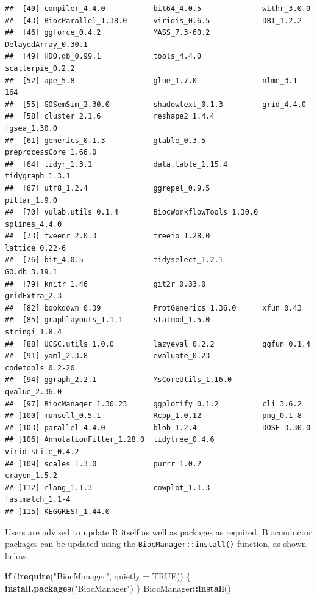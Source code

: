 \documentclass[9pt,a4paper,]{extarticle}
\newenvironment{Shaded}{\begin{snugshade}}{\end{snugshade}}
\newcommand{\AttributeTok}[1]{\textcolor[rgb]{0.13,0.29,0.53}{#1}}
\newcommand{\ConstantTok}[1]{\textcolor[rgb]{0.56,0.35,0.01}{#1}}
\newcommand{\ControlFlowTok}[1]{\textcolor[rgb]{0.13,0.29,0.53}{\textbf{#1}}}
\newcommand{\FunctionTok}[1]{\textcolor[rgb]{0.13,0.29,0.53}{\textbf{#1}}}
\newcommand{\NormalTok}[1]{#1}
\newcommand{\SpecialCharTok}[1]{\textcolor[rgb]{0.81,0.36,0.00}{\textbf{#1}}}
\newcommand{\StringTok}[1]{\textcolor[rgb]{0.31,0.60,0.02}{#1}}
\begin{document}
\begin{verbatim}
##  [40] compiler_4.4.0           bit64_4.0.5              withr_3.0.0             
##  [43] BiocParallel_1.38.0      viridis_0.6.5            DBI_1.2.2               
##  [46] ggforce_0.4.2            MASS_7.3-60.2            DelayedArray_0.30.1     
##  [49] HDO.db_0.99.1            tools_4.4.0              scatterpie_0.2.2        
##  [52] ape_5.8                  glue_1.7.0               nlme_3.1-164            
##  [55] GOSemSim_2.30.0          shadowtext_0.1.3         grid_4.4.0              
##  [58] cluster_2.1.6            reshape2_1.4.4           fgsea_1.30.0            
##  [61] generics_0.1.3           gtable_0.3.5             preprocessCore_1.66.0   
##  [64] tidyr_1.3.1              data.table_1.15.4        tidygraph_1.3.1         
##  [67] utf8_1.2.4               ggrepel_0.9.5            pillar_1.9.0            
##  [70] yulab.utils_0.1.4        BiocWorkflowTools_1.30.0 splines_4.4.0           
##  [73] tweenr_2.0.3             treeio_1.28.0            lattice_0.22-6          
##  [76] bit_4.0.5                tidyselect_1.2.1         GO.db_3.19.1            
##  [79] knitr_1.46               git2r_0.33.0             gridExtra_2.3           
##  [82] bookdown_0.39            ProtGenerics_1.36.0      xfun_0.43               
##  [85] graphlayouts_1.1.1       statmod_1.5.0            stringi_1.8.4           
##  [88] UCSC.utils_1.0.0         lazyeval_0.2.2           ggfun_0.1.4             
##  [91] yaml_2.3.8               evaluate_0.23            codetools_0.2-20        
##  [94] ggraph_2.2.1             MsCoreUtils_1.16.0       qvalue_2.36.0           
##  [97] BiocManager_1.30.23      ggplotify_0.1.2          cli_3.6.2               
## [100] munsell_0.5.1            Rcpp_1.0.12              png_0.1-8               
## [103] parallel_4.4.0           blob_1.2.4               DOSE_3.30.0             
## [106] AnnotationFilter_1.28.0  tidytree_0.4.6           viridisLite_0.4.2       
## [109] scales_1.3.0             purrr_1.0.2              crayon_1.5.2            
## [112] rlang_1.1.3              cowplot_1.1.3            fastmatch_1.1-4         
## [115] KEGGREST_1.44.0
\end{verbatim}

Users are advised to update R itself as well as packages as required.
Bioconductor packages can be updated using the \texttt{BiocManager::install()}
function, as shown below.

\begin{Shaded}
\begin{Highlighting}[]
\ControlFlowTok{if}\NormalTok{ (}\SpecialCharTok{!}\FunctionTok{require}\NormalTok{(}\StringTok{"BiocManager"}\NormalTok{, }\AttributeTok{quietly =} \ConstantTok{TRUE}\NormalTok{)) \{}
  \FunctionTok{install.packages}\NormalTok{(}\StringTok{"BiocManager"}\NormalTok{)}
\NormalTok{\}}
\NormalTok{BiocManager}\SpecialCharTok{::}\FunctionTok{install}\NormalTok{()}
\end{Highlighting}
\end{Shaded}
\end{document}

